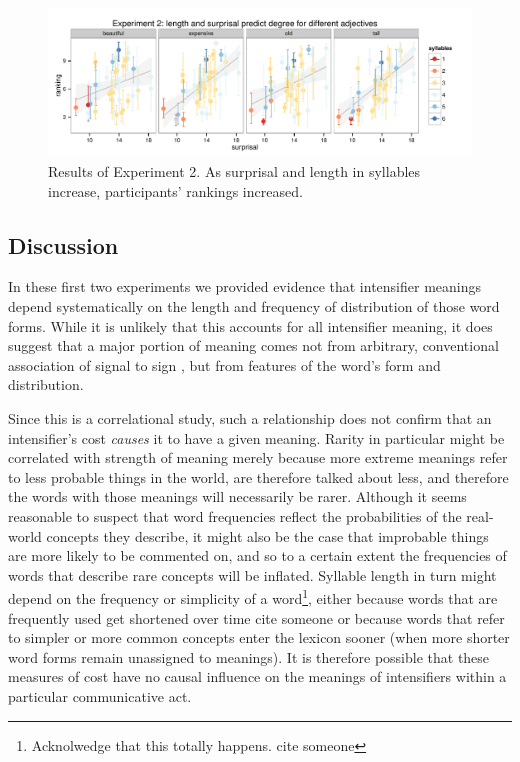 \documentclass[10pt,letterpaper]{article}
\newcommand{\todo}[1]{{\color{red}#1}}
\begin{document}
\begin{figure}[hbt]
\begin{center}
\includegraphics[width=\textwidth]{exp2.pdf}
\end{center}
\caption{Results of Experiment 2. As surprisal and length in syllables increase, participants' rankings increased.} 
\label{exp2-plot}
\end{figure}

\subsection{Discussion}    
In these first two experiments we provided evidence that intensifier meanings depend systematically on the length and frequency of distribution of those word forms.
While it is unlikely that this accounts for all intensifier meaning, it does suggest that a major portion of meaning comes not from arbitrary, conventional association of signal to sign \cite{saussure}, but from features of the word's form and distribution.

Since this is a correlational study, such a relationship does not confirm that an intensifier's cost \emph{causes} it to have a given meaning.%
Rarity in particular might be correlated with strength of meaning merely because more extreme meanings refer to less probable things in the world, are therefore talked about less, and therefore the words with those meanings will necessarily be rarer.
Although it seems reasonable to suspect that word frequencies reflect the probabilities of the real-world concepts they describe, it might also be the case that improbable things are more likely to be commented on, and so to a certain extent the frequencies of words that describe rare concepts will be inflated. Syllable length in turn might depend on the frequency or simplicity of a word\footnote{\todo{Acknolwedge that this totally happens. cite someone}}, either because words that are frequently used get shortened over time \todo{cite someone} or because words that refer to simpler or more common concepts enter the lexicon sooner (when more shorter word forms remain unassigned to meanings). It is therefore possible that these measures of cost have no causal influence on the meanings of intensifiers within a particular communicative act.
\end{document}

